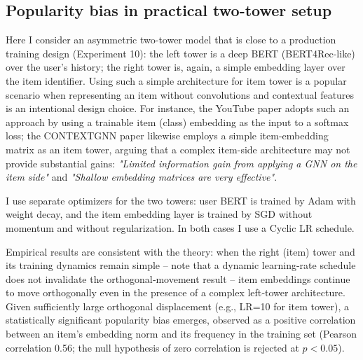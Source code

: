 \subsection{Popularity bias in practical two-tower setup}

Here I consider an asymmetric two-tower model that is close to a production training design (Experiment 10): the left tower is a deep BERT (BERT4Rec-like) over the user's history; the right tower is, again, a simple embedding layer over the item identifier. 
Using such a simple architecture for item tower is a popular scenario when representing an item without convolutions and contextual features is an intentional design choice. 
For instance, the YouTube paper adopts such an approach by using a trainable item (class) embedding as the input to a softmax loss; 
the CONTEXTGNN paper likewise employs a simple item-embedding matrix as an item tower, arguing that a complex item-side architecture may not provide substantial gains: \emph{"Limited information gain from applying a GNN on the item side"} and \emph{"Shallow embedding matrices are very effective"}.

I use separate optimizers for the two towers: user BERT is trained by Adam with weight decay, and the item embedding layer is trained by SGD without momentum and without regularization. 
In both cases I use a Cyclic LR schedule. 

Empirical results are consistent with the theory: when the right (item) tower and its training dynamics remain simple -- note that a dynamic learning-rate schedule does not invalidate the orthogonal‑movement result -- item embeddings continue to move orthogonally even in the presence of a complex left‑tower architecture.
Given sufficiently large orthogonal displacement (e.g., LR=10 for item tower), a statistically significant popularity bias emerges, observed as a positive correlation between an item’s embedding norm and its frequency in the training set (Pearson correlation 0.56; the null hypothesis of zero correlation is rejected at $p<0.05$).


